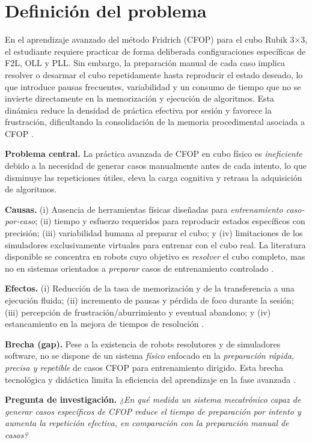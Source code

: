 \section{Definición del problema}

En el aprendizaje avanzado del método Fridrich (CFOP) para el cubo Rubik 3×3, el estudiante requiere practicar de forma deliberada configuraciones específicas de F2L, OLL y PLL. Sin embargo, la preparación manual de cada caso implica resolver o desarmar el cubo repetidamente hasta reproducir el estado deseado, lo que introduce pausas frecuentes, variabilidad y un consumo de tiempo que no se invierte directamente en la memorización y ejecución de algoritmos. Esta dinámica reduce la densidad de práctica efectiva por sesión y favorece la frustración, dificultando la consolidación de la memoria procedimental asociada a CFOP \cite{Boyce2022,Boyce2022b}.

\textbf{Problema central.} La práctica avanzada de CFOP en cubo físico es \emph{ineficiente} debido a la necesidad de generar casos manualmente antes de cada intento, lo que disminuye las repeticiones útiles, eleva la carga cognitiva y retrasa la adquisición de algoritmos.

\textbf{Causas.} (i) Ausencia de herramientas físicas diseñadas para \emph{entrenamiento caso-por-caso}; (ii) tiempo y esfuerzo requeridos para reproducir estados específicos con precisión; (iii) variabilidad humana al preparar el cubo; y (iv) limitaciones de los simuladores exclusivamente virtuales para entrenar con el cubo real. La literatura disponible se concentra en robots cuyo objetivo es \emph{resolver} el cubo completo, mas no en sistemas orientados a \emph{preparar} casos de entrenamiento controlado \cite{Gorriz2023,Monzon2017}.

\textbf{Efectos.} (i) Reducción de la tasa de memorización y de la transferencia a una ejecución fluida; (ii) incremento de pausas y pérdida de foco durante la sesión; (iii) percepción de frustración/aburrimiento y eventual abandono; y (iv) estancamiento en la mejora de tiempos de resolución \cite{Boyce2022}.

\textbf{Brecha (gap).} Pese a la existencia de robots resolutores y de simuladores software, no se dispone de un sistema \emph{físico} enfocado en la \emph{preparación rápida, precisa y repetible} de casos CFOP para entrenamiento dirigido. Esta brecha tecnológica y didáctica limita la eficiencia del aprendizaje en la fase avanzada \cite{Gorriz2023,Monzon2017}.

\textbf{Pregunta de investigación.} 
\emph{¿En qué medida un sistema mecatrónico capaz de generar casos específicos de CFOP reduce el tiempo de preparación por intento y aumenta la repetición efectiva, en comparación con la preparación manual de casos?}

